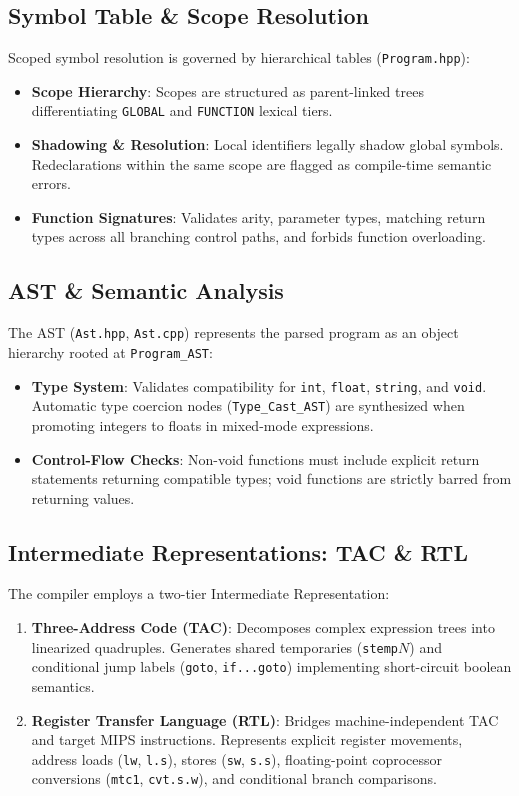 \documentclass[10pt,twocolumn,a4paper]{article}
\begin{document}
\subsection{Symbol Table \& Scope Resolution}
Scoped symbol resolution is governed by hierarchical tables (\texttt{Program.hpp}):
\begin{itemize}
    \item \textbf{Scope Hierarchy}: Scopes are structured as parent-linked trees differentiating \texttt{GLOBAL} and \texttt{FUNCTION} lexical tiers.
    \item \textbf{Shadowing \& Resolution}: Local identifiers legally shadow global symbols. Redeclarations within the same scope are flagged as compile-time semantic errors.
    \item \textbf{Function Signatures}: Validates arity, parameter types, matching return types across all branching control paths, and forbids function overloading.
\end{itemize}

\subsection{AST \& Semantic Analysis}
The AST (\texttt{Ast.hpp}, \texttt{Ast.cpp}) represents the parsed program as an object hierarchy rooted at \texttt{Program\_AST}:
\begin{itemize}
    \item \textbf{Type System}: Validates compatibility for \texttt{int}, \texttt{float}, \texttt{string}, and \texttt{void}. Automatic type coercion nodes (\texttt{Type\_Cast\_AST}) are synthesized when promoting integers to floats in mixed-mode expressions.
    \item \textbf{Control-Flow Checks}: Non-void functions must include explicit return statements returning compatible types; void functions are strictly barred from returning values.
\end{itemize}

\subsection{Intermediate Representations: TAC \& RTL}
The compiler employs a two-tier Intermediate Representation:
\begin{enumerate}
    \item \textbf{Three-Address Code (TAC)}: Decomposes complex expression trees into linearized quadruples. Generates shared temporaries (\texttt{stemp$N$}) and conditional jump labels (\texttt{goto}, \texttt{if...goto}) implementing short-circuit boolean semantics.
    \item \textbf{Register Transfer Language (RTL)}: Bridges machine-independent TAC and target MIPS instructions. Represents explicit register movements, address loads (\texttt{lw}, \texttt{l.s}), stores (\texttt{sw}, \texttt{s.s}), floating-point coprocessor conversions (\texttt{mtc1}, \texttt{cvt.s.w}), and conditional branch comparisons.
\end{enumerate}
\end{document}
